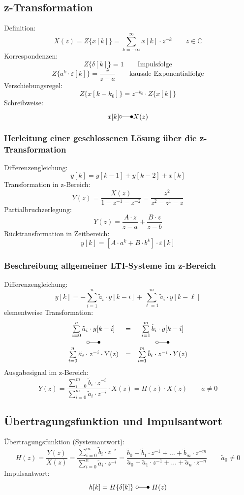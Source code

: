 \documentclass[a4paper, 10pt, fleqn]{article}
\begin{document}
\subsection{z-Transformation}
Definition:
\[ X(z) = Z\{x[k]\} = \sum\limits_{k = -\infty}^{\infty} x[k] \cdot z^{-k} \qquad z \in \mathbb{C} \]
Korrespondenzen: 
\[ Z\{\delta[k]\} = 1 \qquad \text{Impulsfolge} \]
\[ Z\{a^k \cdot \varepsilon[k]\} = \frac{z}{z - a} \qquad \text{kausale Exponentialfolge} \]
Verschiebungsregel:
\[ Z\{x[k - k_0]\} = z^{-k_0} \cdot Z\{x[k]\} \]
Schreibweise:
\[ x[k] \laplace X(z) \]

\subsubsection{Herleitung einer geschlossenen Lösung über die z-Transformation}
Differenzengleichung: 
\[ y[k] = y[k - 1] + y[k - 2] + x[k] \]
Transformation in z-Bereich:
\[ Y(z) = \frac{X(z)}{1 - z^{-1} - z^{-2}} = \frac{z^2}{z^2 - z^1 - z} \]
Partialbruchzerlegung: 
\[ Y(z) = \frac{A \cdot z}{z - a} + \frac{B \cdot z}{z - b} \]
Rücktransformation in Zeitbereich:
\[ y[k] = \left[ A \cdot a^k + B \cdot b^k \right] \cdot \varepsilon[k] \]

\subsubsection{Beschreibung allgemeiner LTI-Systeme im z-Bereich}
Differenzengleichung:
\[ y[k] = -\sum\limits_{i = 1}^{n} \tilde{a}_i \cdot y[k - i] + \sum\limits_{\ell = 1}^{m} \tilde{a}_i \cdot y[k - \ell] \]
elementweise Transformation:
\[ \begin{array}{ccc}
    \sum\limits_{i = 0}^{n} \tilde{a}_i \cdot y[k - i] & 
        = & 
        \sum\limits_{i = 1}^{m} \tilde{b}_i \cdot y[k - i] \\
    \laplace &   & \laplace \\
    \sum\limits_{i = 0}^{n} \tilde{a}_i \cdot z^{-i} \cdot Y(z) & 
        = & 
        \sum\limits_{i = 1}^{m} \tilde{b}_i \cdot z^{-i} \cdot Y(z) \\
\end{array} \]
Ausgabesignal im z-Bereich:
\[ Y(z) = \frac{\sum\limits_{i = 0}^{m} \tilde{b}_i \cdot z^{-i}}
    {\sum\limits_{i = 0}^{m} \tilde{a}_i \cdot z^{-i}} 
    \cdot X(z) = H(z) \cdot X(z) \qquad \tilde{a} \neq 0
\]

\subsection{Übertragungsfunktion und Impulsantwort}
Übertragungsfunktion (Systemantwort):
\[ H(z) = \frac{Y(z)}{X(z)} 
    = \frac{\sum\limits_{i = 0}^{m} \tilde{b}_i \cdot z^{-i}}
    {\sum\limits_{i = 0}^{n} \tilde{a}_i \cdot z^{-i}}
    = \frac{\tilde{b}_0 + \tilde{b}_1 \cdot z^{-1} + \ldots + \tilde{b}_m \cdot z^{-m}}
    {\tilde{a}_0 + \tilde{a}_1 \cdot z^{-1} + \ldots + \tilde{a}_n \cdot z^{-n}}
    \qquad \tilde{a}_0 \neq 0 \]
Impulsantwort:
\[ h[k] = H\{ \delta[k] \} ~ \laplace ~ H(z) \]
\end{document}
